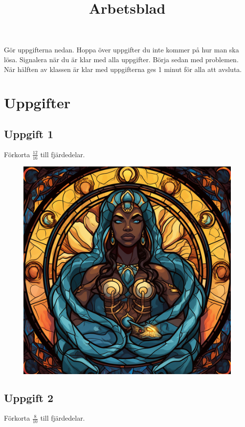 \documentclass[twocolumn]{article}
\title{\Huge Arbetsblad}
\date{}
\author{}
\begin{document}
\maketitle

\large Gör uppgifterna nedan. Hoppa över uppgifter du inte kommer på hur man ska lösa. Signalera när du är klar med alla uppgifter. Börja sedan med problemen. När hälften av klassen är klar med uppgifterna ges 1 minut för alla att avsluta.

\section{Uppgifter}

\subsection*{\centering Uppgift 1}
{\large Förkorta $\frac{12}{16}$ till fjärdedelar.}

\begin{figure}[htp]
\centering
\includegraphics[width=0.75\linewidth]{1.png}
\end{figure}


\subsection*{\centering Uppgift 2}
{\large Förkorta $\frac{8}{10}$ till fjärdedelar.}
\end{document}
